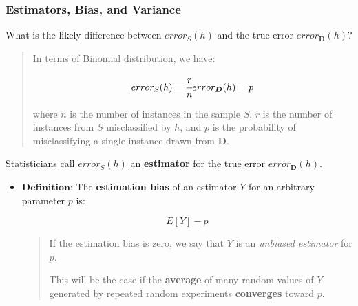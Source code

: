 \hypertarget{estimators-bias-and-variance}{%
\subsubsection{Estimators, Bias, and
Variance}\label{estimators-bias-and-variance}}

What is the likely difference between \(error_S(h)\) and the true error
\(error_{\boldsymbol{D}}(h)\)?

\begin{quote}
In terms of Binomial distribution, we have:

\[error_S(h)=\cfrac{r}{n}\\
error_{\boldsymbol{D}}(h)=p\]

where \(n\) is the number of instances in the sample \(S\), \(r\) is the
number of instances from \(S\) misclassified by \(h\), and \(p\) is the
probability of misclassifying a single instance drawn from
\(\boldsymbol{D}\).
\end{quote}

\underline{Statisticians call \(error_S(h)\) an \textbf{estimator} for the true error \(error_{\boldsymbol{D}}(h)\).}

\begin{itemize}
\item
  \(\textbf{Definition}\): The \textbf{estimation bias} of an estimator
  \(Y\) for an arbitrary parameter \(p\) is:

  \[E[Y]-p\]

  \begin{quote}
  If the estimation bias is zero, we say that \(Y\) is an \emph{unbiased
  estimator} for \(p\).

  This will be the case if the \textbf{average} of many random
  values of \(Y\) generated by repeated random experiments
  \textbf{converges} toward \(p\).
  \end{quote}
\end{itemize}


